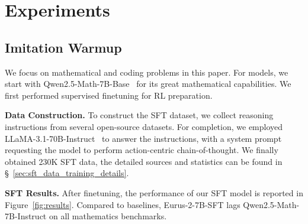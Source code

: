 \section{Experiments}


\subsection{Imitation Warmup}
We focus on mathematical and coding problems in this paper. For models, we start with Qwen2.5-Math-7B-Base~\citep{yang2024qwen25mathtechnicalreportmathematical} for its great mathematical capabilities. We first performed supervised finetuning for RL preparation. 


\textbf{Data Construction.}
To construct the SFT dataset, we collect reasoning instructions from several open-source datasets. For completion, we employed LLaMA-3.1-70B-Instruct~\citep{grattafiori2024llama3herdmodels} to answer the instructions, with a system prompt requesting the model to perform action-centric chain-of-thought. 
We finally obtained 230K SFT data, the detailed sources and statistics can be found in \S~\ref{sec:sft_data_training_details}.

\textbf{SFT Results.}
After finetuning, the performance of our SFT model is reported in Figure~\ref{fig:results}.
Compared to baselines, Eurus-2-7B-SFT lags Qwen2.5-Math-7B-Instruct on all mathematics benchmarks.

